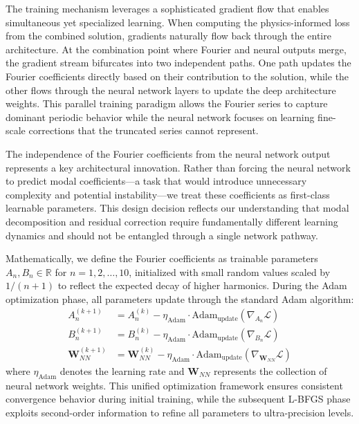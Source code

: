The training mechanism leverages a sophisticated gradient flow that enables simultaneous yet specialized learning. When computing the physics-informed loss from the combined solution, gradients naturally flow back through the entire architecture. At the combination point where Fourier and neural outputs merge, the gradient stream bifurcates into two independent paths. One path updates the Fourier coefficients directly based on their contribution to the solution, while the other flows through the neural network layers to update the deep architecture weights. This parallel training paradigm allows the Fourier series to capture dominant periodic behavior while the neural network focuses on learning fine-scale corrections that the truncated series cannot represent.

The independence of the Fourier coefficients from the neural network output represents a key architectural innovation. Rather than forcing the neural network to predict modal coefficients—a task that would introduce unnecessary complexity and potential instability—we treat these coefficients as first-class learnable parameters. This design decision reflects our understanding that modal decomposition and residual correction require fundamentally different learning dynamics and should not be entangled through a single network pathway.

Mathematically, we define the Fourier coefficients as trainable parameters $A_n, B_n \in \mathbb{R}$ for $n = 1, 2, \ldots, 10$, initialized with small random values scaled by $1/(n+1)$ to reflect the expected decay of higher harmonics. During the Adam optimization phase, all parameters update through the standard Adam algorithm:
\begin{align}
A_n^{(k+1)} &= A_n^{(k)} - \eta_{\text{Adam}} \cdot \text{Adam}_{\text{update}}(\nabla_{A_n}\mathcal{L}) \\
B_n^{(k+1)} &= B_n^{(k)} - \eta_{\text{Adam}} \cdot \text{Adam}_{\text{update}}(\nabla_{B_n}\mathcal{L}) \\
\mathbf{W}_{NN}^{(k+1)} &= \mathbf{W}_{NN}^{(k)} - \eta_{\text{Adam}} \cdot \text{Adam}_{\text{update}}(\nabla_{\mathbf{W}_{NN}}\mathcal{L})
\end{align}
where $\eta_{\text{Adam}}$ denotes the learning rate and $\mathbf{W}_{NN}$ represents the collection of neural network weights. This unified optimization framework ensures consistent convergence behavior during initial training, while the subsequent L-BFGS phase exploits second-order information to refine all parameters to ultra-precision levels.

